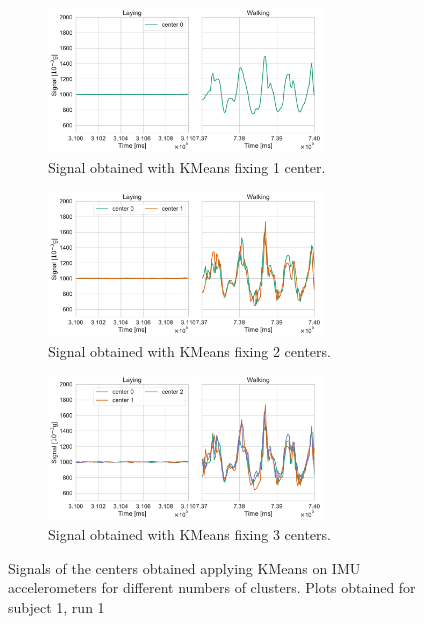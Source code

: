 \documentclass[10pt, a4paper, twocolumn]{article}
\theoremstyle{definition}
\begin{document}
\begin{figure} \centering
\begin{subfigure}{\textwidth}\centering
         \includegraphics[width=0.8\textwidth]{../clustering/clustering_results_euclidean/subject_1/run_1/IMU_acc1_centers.pdf}
         \caption{Signal obtained with KMeans fixing 1 center.}\label{fig:imuacc1}
     \end{subfigure}
     
\begin{subfigure}{\textwidth}\centering
         \includegraphics[width=0.8\textwidth]{../clustering/clustering_results_euclidean/subject_1/run_1/IMU_acc2_centers.pdf}
         \caption{Signal obtained with KMeans fixing 2 centers.}\label{fig:imuacc2}
     \end{subfigure}
     
\begin{subfigure}{\textwidth}\centering
         \includegraphics[width=0.8\textwidth]{../clustering/clustering_results_euclidean/subject_1/run_1/IMU_acc3_centers.pdf}
         \caption{Signal obtained with KMeans fixing 3 centers.}\label{fig:imuacc3}
     \end{subfigure}
     
  \caption{Signals of the centers obtained applying KMeans on IMU accelerometers for different numbers of clusters. Plots obtained for subject 1, run 1}\label{fig:imuacc}
\end{figure}
\end{document}
